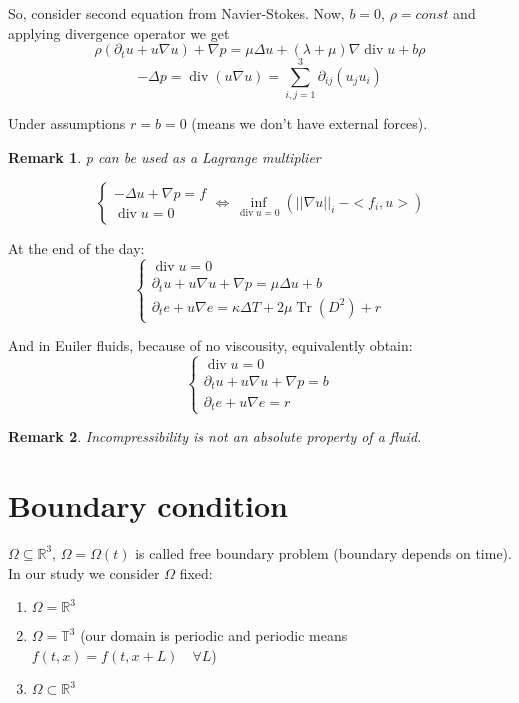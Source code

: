\documentclass[12pt]{article}
\DeclareMathOperator{\Tr}{Tr}
\DeclareMathOperator{\Div}{div}
\newtheorem{remark}{Remark}
\begin{document}
So, consider second equation from Navier-Stokes. Now, $b = 0$, $\rho = const$
and applying divergence operator we get
$$
    \rho(\partial_t u + u\nabla u) + \nabla p = \mu\Delta u + 
    (\lambda + \mu)\nabla\Div u + b\rho
$$
$$
    -\Delta  p = \Div(u\nabla u) = \sum_{i,j=1}^{3}\partial_{ij}(u_j u_i)
$$

Under assumptions $r=b=0$ (means we don't have external forces).

\begin{remark}
    p can be used as a Lagrange multiplier
\end{remark}

$$
    \begin{cases}
        -\Delta u + \nabla p = f\\
        \Div u = 0
    \end{cases}
    \Leftrightarrow
    \inf_{\Div u = 0} \left( \vert\vert \nabla u \vert\vert_{i}\: - <f_i,u> \right)
$$

At the end of the day:
$$
    \begin{cases}
        \Div u = 0 \\
        \partial_t u + u \nabla u + \nabla p = \mu\Delta u + b\\
        \partial_t e + u \nabla e = \kappa\Delta T + 2\mu\Tr(D^2) + r
    \end{cases}
$$

And in Euiler fluids, because of no viscousity, equivalently obtain:
$$
    \begin{cases}
        \Div u = 0 \\
        \partial_t u + u \nabla u + \nabla p = b\\
        \partial_t e + u \nabla e = r
    \end{cases}
$$

\begin{remark}
    Incompressibility is not an absolute property of a fluid.
\end{remark}

\section{Boundary condition}
$\Omega \subseteq \mathbb{R}^3$, $\Omega = \Omega(t)$ is called
free boundary problem (boundary depends on time). In our study
we consider $\Omega$ fixed:\\

\begin{enumerate}
    \item $\Omega = \mathbb{R}^3$
    \item $\Omega = \mathbb{T}^3$  (our domain is periodic
    and periodic means $f(t,x) =f(t,x+L)\quad\forall L$)
    \item $\Omega \subset \mathbb{R}^3$
\end{enumerate}
\end{document}
